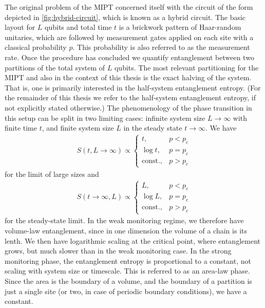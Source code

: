 The original problem of the MIPT concerned itself with the circuit of the form depicted in
\cref{fig:hybrid-circuit}, which is known as a hybrid circuit. The basic
layout for $L$ qubits and total time $t$
is a brickwork pattern of Haar-random unitaries, which are followed by
measurement gates applied on each site with a classical probability
$p$. This probability is also referred to as the measurement rate. 
Once the procedure has concluded we quantify entanglement between two
partitions of the total system of $L$ qubits. The most relevant partitioning
for the MIPT and also in the context of this thesis is the exact halving of the
system. That is, one is primarily interested in the half-system entanglement
entropy. (For the remainder of this thesis we refer to the half-system
entanglement entropy, if not explicitly stated otherwise.) The
phenomenology of the phase transition in this setup can be split in two
limiting cases: infinite system size $L\to \infty$ with finite time $t$, and
finite system size $L$ in the steady state $t \to \infty$. We have
\begin{align}
  S(t, L\to \infty) \propto \begin{cases}
    t, & p<p_c\\
    \log t, & p=p_c\\
    \mathrm{const.}, & p>p_c
  \end{cases}
\end{align}
for the limit of large sizes and
\begin{align}
  S(t\to \infty, L) \propto \begin{cases}
    L, & p<p_c\\
    \log L, & p=p_c\\
    \mathrm{const.}, & p>p_c
  \end{cases}
\end{align}
for the steady-state limit.
In the weak monitoring regime, we therefore have volume-law entanglement, since
in one dimension the volume of a chain is its lenth. We then have logarithmic
scaling at the critical point, where entanglement grows, but much slower than
in the weak monitoring case. In the strong monitoring phase, the entanglement
entropy is proportional to a constant, not scaling with system size or
timescale. This is referred to as an area-law phase. Since the area is the
boundary of a volume, and the boundary of a partition is just a single site (or
two, in case of periodic boundary conditions), we have a constant. 

